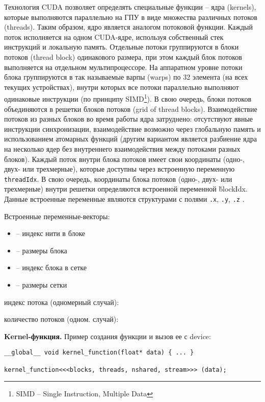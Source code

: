 Технология CUDA позволяет определять специальные функции – ядра (kernels), которые выполняются параллельно на ГПУ в виде множества различных потоков (threads). Таким образом, ядро является аналогом потоковой функции. Каждый поток исполняется на одном CUDA-ядре, используя собственный стек инструкций и локальную память. Отдельные потоки группируются в блоки потоков (thread block) одинакового размера, при этом каждый блок потоков выполняется на отдельном мультипроцессоре.
На аппаратном уровне потоки блока группируются в так называемые варпы (warps) по 32 элемента (на всех текущих устройствах), внутри которых все потоки параллельно выполняют одинаковые инструкции (по принципу SIMD\footnote{SIMD -- Single Instruction, Multiple Data}).
В свою очередь, блоки потоков объединяются в решетки блоков потоков (grid of thread blocks). Взаимодействие потоков из разных блоков во время работы ядра затруднено: отсутствуют явные инструкции синхронизации, взаимодействие возможно через глобальную память и использованием атомарных функций (другим вариантом является разбиение ядра на несколько ядер без внутреннего взаимодействия между потоками разных блоков).
Каждый поток внутри блока потоков имеет свои координаты (одно-, двух- или трехмерные), которые доступны через встроенную переменную \texttt{threadIdx}. В свою очередь, координаты блока потоков (одно-, двух- или трехмерные) внутри решетки определяются встроенной переменной \v{blockIdx}. Данные встроенные переменные являются структурами с полями \texttt{.x}, \texttt{.y}, \texttt{.z} \cite{DenisenkoSatanin2012}.

Встроенные переменные-векторы:
\begin{itemize}
    \item{} -- индекс нити в блоке
    \item{} -- размеры блока
    \item{} -- индекс блока в сетке
    \item{} -- размеры сетки
\end{itemize}

 индекс потока (одномерный случай): 

 количество потоков (одном. случай): 

\textbf{Kernel-функция.} Пример создания функции и вызов ее с device:
\begin{verbatim}
__global__ void kernel_function(float* data) { ... }

kernel_function<<<blocks, threads, nshared, stream>>> (data);
\end{verbatim}

